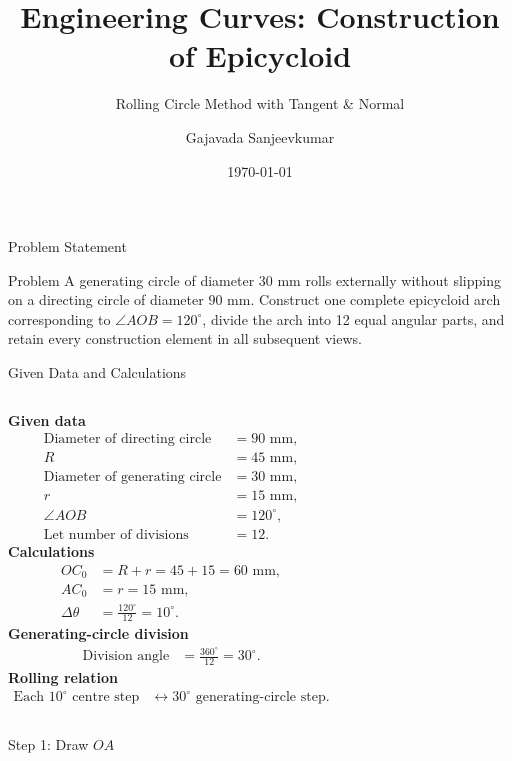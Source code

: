 \documentclass[aspectratio=169,10pt]{beamer}
\title[Engineering Curves: Epicycloid]{Engineering Curves: Construction of Epicycloid}
\subtitle{Rolling Circle Method with Tangent \& Normal}
\author{Gajavada Sanjeevkumar}
\date{\today}
\newcommand{\Legend}[1]{\node[draw=gray!35,fill=white,rounded corners=2pt,inner sep=3pt,anchor=north east,align=left,font=\scriptsize,text width=31mm] at (84,84){#1};}
\newcommand{\OADim}{\draw[dimension line]($(O)+(240:6)$)--($(A)+(240:6)$)node[midway,sloped,above,fill=white,inner sep=1pt,font=\scriptsize]{$45\ \mathrm{mm}$};\draw[thin,black!55]($(O)+(240:1)$)--($(O)+(240:8)$);\draw[thin,black!55]($(A)+(240:1)$)--($(A)+(240:8)$);}
\begin{document}
\begin{frame}[plain]\titlepage\end{frame}
\begin{frame}{Problem Statement}
\begin{block}{Problem}
\vspace{0.35em}
A generating circle of diameter $30$ mm rolls externally without slipping on a directing circle of diameter $90$ mm. Construct one complete epicycloid arch corresponding to $\angle AOB=120^\circ$, divide the arch into 12 equal angular parts, and retain every construction element in all subsequent views.
\vspace{0.35em}
\end{block}
\end{frame}
\begin{frame}{Given Data and Calculations}
\begin{columns}[T,onlytextwidth]
\textbf{Given data}
\begin{align*}
\text{Diameter of directing circle} &=90\text{ mm},\\
R&=45\text{ mm},\\
\text{Diameter of generating circle} &=30\text{ mm},\\
r&=15\text{ mm},\\
\angle AOB&=120^\circ,\\
\text{Let number of divisions}&=12.
\end{align*}
\vspace{-0.4em}
\textbf{Calculations}
\begin{align*}
OC_0&=R+r=45+15=60\text{ mm},\\
AC_0&=r=15\text{ mm},\\
\Delta\theta&=\frac{120^\circ}{12}=10^\circ.
\end{align*}
\textbf{Generating-circle division}
\begin{align*}
\text{Division angle}&=\frac{360^\circ}{12}=30^\circ.
\end{align*}
\vspace{0.3em}
\textbf{Rolling relation}
\begin{align*}
\text{Each }10^\circ\text{ centre step}&\leftrightarrow 30^\circ\text{ generating-circle step}.
\end{align*}
\end{columns}
\end{frame}
\begin{frame}{Step 1: Draw $OA$}\centering{}\end{frame}
\end{document}
